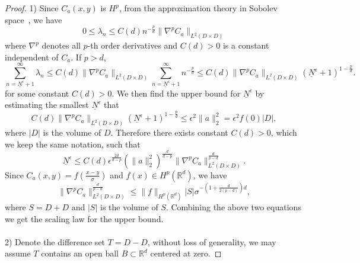 \documentclass[11pt]{amsart}
\begin{document}
\begin{proof}
1) Since $C_a (x,y)$ is $H^p$, from the approximation theory in Sobolev space~\cite{brenner2007mathematical}, we have 
\begin{equation}
\label{eq:bound}
0\le \lambda_n \le C(d) n^{-\frac{p}{d}} \|\nabla^p C_a \|_{L^2(D\times D)}
\end{equation}
where $\nabla^p$ denotes all $p$-th order derivatives and $C(d)>0$ is a constant independent of $C_a$. If $p>d$, 
\begin{equation}
	\sum_{n=\underline{N}^{\epsilon}+1}^{\infty} \lambda_n \le C(d) \|\nabla^p C_a\|_{L^2(D\times D)} \sum_{n=\underline{N}^{\epsilon}+1}^{\infty} n^{-\frac{p}{d}} \le C(d)\|\nabla^p C_a\|_{L^2(D\times D)} \left({\underline{N}^{\epsilon}}+1\right)^{1-\frac{p}{d}}.
\end{equation}
for some constant $C(d) > 0$. We then find the upper bound for $\underline{N}^{\epsilon}$ by estimating the smallest $\underline{N}^{\epsilon}$ that
\begin{equation}
C(d)\|\nabla^p C_a\|_{L^2(D\times D)} \left({\underline{N}^{\epsilon}}+1\right)^{1-\frac{p}{d}} \le \epsilon^2\|a\|_2^2 =\epsilon^2f(0)|D|,
\end{equation}
where $|D|$ is the volume of $D$. Therefore there exists constant $C(d) > 0$, which we keep the same notation, such that
\begin{equation}
\label{eq:ep1}
	\underline{N}^{\epsilon} \le C(d) \epsilon^{\frac{2d}{d - p}} (\|a\|_2^2)^{\frac{d}{d - p}} \|\nabla^{p} C_a\|_{L^2(D\times D)}^{\frac{d}{p - d}}.
\end{equation}
Since $C_a (x,y)=f(\frac{x-y}{\sigma})$ and $f(x) \in H^p(\mathbb{R}^d)$, we have
\begin{equation}
\|\nabla^{p} C_a\|_{L^2(D\times D)}^{\frac{d}{p-d}} \le \|f\|_{H^p(\mathbb{R}^d)}|S|\sigma^{-(1+\frac{d}{2(p - d)})d},
\end{equation}
where $S=D+D$ and $|S|$ is the volume of $S$. Combining the above two equations we get the scaling law for the upper bound.
\\ \\
2) Denote the difference set $T = D-D$, without loss of generality, we may assume $T$ contains an open ball $B\subset \mathbb{R}^d$ centered at zero. 


\end{proof}
\end{document}
